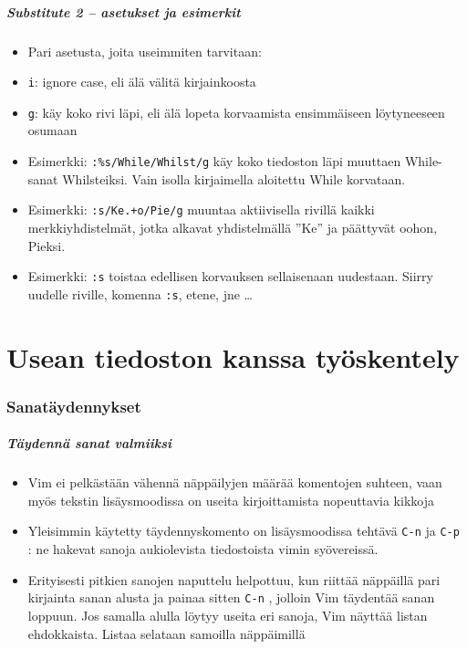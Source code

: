 \documentclass[]{beamer}
\newcommand{\Tohj}[1]{\texttt{#1}}
\newcommand{\com}[1]{{\color{blue!50!black}\Tohj{#1}} \!\!}
\newcommand{\code}[1]{\texttt{#1}}
\begin{document}
\begin{frame}
    \frametitle{Substitute 2 -- asetukset ja esimerkit}
    \begin{itemize}
        \item Pari asetusta, joita useimmiten tarvitaan:
        \item \code{i}: ignore case, eli älä välitä kirjainkoosta
        \item \code{g}: käy koko rivi läpi, eli älä lopeta korvaamista ensimmäiseen löytyneeseen osumaan
        \pause
        \item Esimerkki: \code{:\%s/While/Whilst/g} käy koko tiedoston läpi muuttaen While-sanat Whilsteiksi. Vain isolla kirjaimella aloitettu While korvataan.
        \item Esimerkki: \code{:s/Ke.+o/Pie/g} muuntaa aktiivisella rivillä kaikki merkkiyhdistelmät, jotka alkavat yhdistelmällä ''Ke'' ja päättyvät oohon, Pieksi. 
        \item Esimerkki: \code{:s} toistaa edellisen korvauksen sellaisenaan uudestaan. Siirry uudelle riville, komenna \code{:s}, etene, jne \ldots
    \end{itemize}
\end{frame}


\part{Usean tiedoston kanssa työskentely}

\section {Sanatäydennykset}

\begin{frame}
    \frametitle{Täydennä sanat valmiiksi}
    \begin{itemize}
        \item Vim ei pelkästään vähennä näppäilyjen määrää komentojen suhteen, vaan myös tekstin lisäysmoodissa on useita kirjoittamista nopeuttavia kikkoja
        \pause
        \item Yleisimmin käytetty täydennyskomento on lisäysmoodissa tehtävä \com{C-n} ja \com{C-p}: ne hakevat sanoja aukiolevista tiedostoista vimin syövereissä. 
        \item Erityisesti pitkien sanojen naputtelu helpottuu, kun riittää näppäillä pari kirjainta sanan alusta ja painaa sitten \com{C-n}, jolloin Vim täydentää sanan loppuun. Jos samalla alulla löytyy useita eri sanoja, Vim näyttää listan ehdokkaista. Listaa selataan samoilla näppäimillä
    \end{itemize}
\end{frame}
\end{document}
